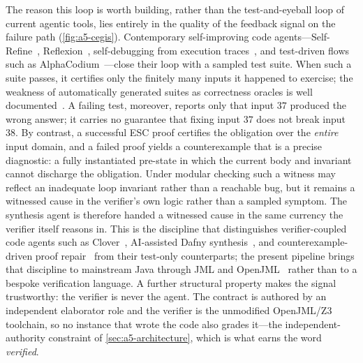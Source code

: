 The reason this loop is worth building, rather than the test-and-eyeball loop of current agentic tools, lies entirely in the quality of the feedback signal on the failure path (\cref{fig:a5-cegis}). Contemporary self-improving code agents---Self-Refine~\cite{madaan2023selfrefine}, Reflexion~\cite{shinn2023reflexion}, self-debugging from execution traces~\cite{chen2024selfdebug}, and test-driven flows such as AlphaCodium~\cite{ridnik2024alphacodium}---close their loop with a sampled test suite. When such a suite passes, it certifies only the finitely many inputs it happened to exercise; the weakness of automatically generated suites as correctness oracles is well documented~\cite{liu2023evalplus,chen2021codex,austin2021mbpp}. A failing test, moreover, reports only that input $37$ produced the wrong answer; it carries no guarantee that fixing input $37$ does not break input $38$. By contrast, a successful ESC proof certifies the obligation over the \emph{entire} input domain, and a failed proof yields a counterexample that is a precise diagnostic: a fully instantiated pre-state in which the current body and invariant cannot discharge the obligation. Under modular checking such a witness may reflect an inadequate loop invariant rather than a reachable bug, but it remains a witnessed cause in the verifier's own logic rather than a sampled symptom. The synthesis agent is therefore handed a witnessed cause in the same currency the verifier itself reasons in. This is the discipline that distinguishes verifier-coupled code agents such as Clover~\cite{sun2024clover}, AI-assisted Dafny synthesis~\cite{misu2024dafny,leino2010dafny}, and counterexample-driven proof repair~\cite{yang2025verus,mugnier2025dafnypro} from their test-only counterparts; the present pipeline brings that discipline to mainstream Java through JML and OpenJML~\cite{leavens2006jml,cok2011openjml} rather than to a bespoke verification language. A further structural property makes the signal trustworthy: the verifier is never the agent. The contract is authored by an independent elaborator role and the verifier is the unmodified OpenJML/Z3 toolchain, so no instance that wrote the code also grades it---the independent-authority constraint of \cref{sec:a5-architecture}, which is what earns the word \emph{verified}.

